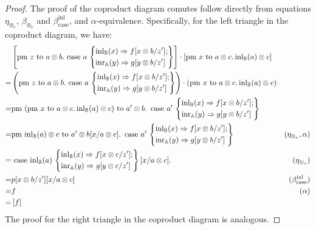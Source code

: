 \documentclass[10pt,a4paper]{amsart}
\theoremstyle{definition}
\theoremstyle{definition}
\theoremstyle{definition}
\theoremstyle{definition}
\theoremstyle{definition}
\theoremstyle{definition}
\begin{document}
\begin{proof}
The proof of the coproduct diagram comutes follow directly from equations $\eta_{\otimes_e}$, $\beta_{\otimes_e}$ and $\beta_{\text{case}}^{\text{inl}}$, and $\alpha$-equivalence. Specifically, for the left triangle in the coproduct diagram, we have:
  \begin{align*}
    & \left[\text{pm } z \text{ to } a \otimes b. \text{ case } a\, \left\{ \begin{aligned}
      & \mathrm{inl}_{\mathbb{B}}(x) \Rightarrow f[x \otimes b/z'];\\
      & \mathrm{inr}_{\mathbb{A}}(y) \Rightarrow g [y \otimes b/z']
    \end{aligned}
      \right\}
      \right] \cdot \left[\text{pm }x \text{ to } a\otimes c. \, \mathrm{inl}_{\mathbb{B}}(a) \otimes c \right]  \\
    =& \left(\text{pm } z \text{ to } a \otimes b. \text{ case } a\, \left\{ \begin{aligned}
      & \mathrm{inl}_{\mathbb{B}}(x) \Rightarrow f[x \otimes b/z'];\\
      & \mathrm{inr}_{\mathbb{A}}(y) \Rightarrow g [y \otimes b/z']
    \end{aligned}
      \right\} \right) \cdot \left( \text{pm }x \text{ to } a\otimes c. \, \mathrm{inl}_{\mathbb{B}}(a) \otimes c \right) 
   \\
    =& \text{pm } (\text{pm }x \text{ to } a\otimes c. \, \mathrm{inl}_{\mathbb{B}}(a) \otimes c ) \text{ to } a' \otimes b . \, \text{ case } a'\, \left\{ \begin{aligned}
      & \mathrm{inl}_{\mathbb{B}}(x) \Rightarrow f[x \otimes b/z'];\\
      & \mathrm{inr}_{\mathbb{A}}(y) \Rightarrow g [y \otimes b/z']
    \end{aligned} \right\}\\
    = &\text{pm } \mathrm{inl}_{\mathbb{B}}(a) \otimes c  \text{ to } a' \otimes b [x/ a \otimes c]. \, \text{ case } a'\, \left\{ \begin{aligned}
      & \mathrm{inl}_{\mathbb{B}}(x) \Rightarrow f[x \otimes b/z'];\\
      & \mathrm{inr}_{\mathbb{A}}(y) \Rightarrow g [y \otimes b/z']
    \end{aligned} \right\} & (\eta_{\otimes_e},\alpha)  \\
     = &\text{ case } \mathrm{inl}_{\mathbb{B}}(a)\, \left\{ \begin{aligned}
      & \mathrm{inl}_{\mathbb{B}}(x) \Rightarrow f[x \otimes c/z'];\\
      & \mathrm{inr}_{\mathbb{A}}(y) \Rightarrow g [y \otimes c/z']
    \end{aligned} \right\} [x/ a \otimes c]. & (\eta_{\otimes_e})  \\
    = & p[x \otimes b/z'] [x/ a \otimes c] & (\beta_{\text{case}}^{\text{inl}}) \\
    = & f  & (\alpha) \\
    = &  \left[ f\right]  \\
  \end{align*}
  The proof for the right triangle in the coproduct diagram is analogous.


\end{proof}
\end{document}
